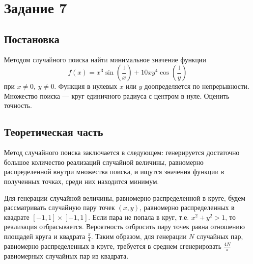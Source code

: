 \documentclass[12pt, a4paper]{article}
\begin{document}
\section{Задание 7}
\subsection{Постановка}
	Методом случайного поиска найти минимальное значение функции 
	\[ f(x)= x^3\sin\left( \frac 1{x} \right) + 10xy^4\cos\left( \frac 1 {y} \right) \]
	при $x\neq 0,\ y\neq 0$. Функция в нулевых $x$ или $y$ доопределяется по непрерывности.
	Множество поиска --- круг единичного радиуса с центром в нуле. Оценить точность.
\subsection{Теоретическая часть}
Метод случайного поиска заключается в следующем: генерируется достаточно большое количество реализаций случайной величины, равномерно распределенной внутри множества поиска, и ищутся значения функции в полученных точках, среди них находится минимум.

Для генерации случайной величины, равномерно распределенной в круге, будем рассматривать случайную пару точек $(x,y)$, равномерно распределенных в квадрате $[-1,1]\times [-1,1]$. Если пара не попала в круг, т.е. $x^2+y^2>1$, то реализация отбрасывается. Вероятность отбросить пару точек равна отношению площадей круга и квадрата $\frac{\pi}{4}$. Таким образом, для генерации $N$ случайных пар, равномерно распределенных в круге, требуется в среднем сгенерировать $\frac{4N}{\pi}$ равномерных случайных пар из квадрата. 
\end{document}
